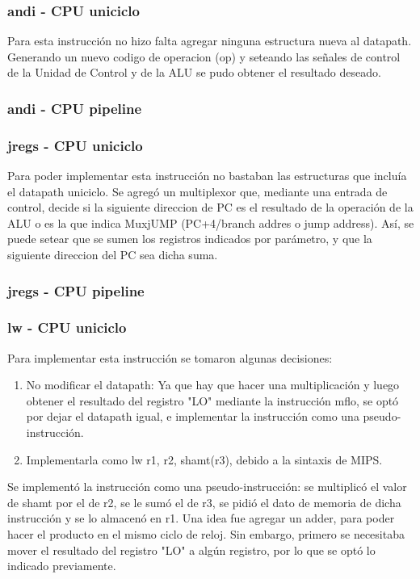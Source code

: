 \documentclass[a4paper, 12pt]{article}
\begin{document}
	\subsubsection{andi - CPU uniciclo}
	Para esta instrucción no hizo falta agregar ninguna estructura nueva al datapath. Generando un nuevo codigo de operacion (op) y seteando las señales de control de la Unidad de Control y de la ALU  se pudo obtener el resultado deseado.
	
	\subsubsection{andi - CPU pipeline}
	
	\subsubsection{jregs - CPU uniciclo}
	Para poder implementar esta instrucción no bastaban las estructuras que incluía el datapath uniciclo.
	Se agregó un multiplexor que, mediante una entrada de control, decide si la siguiente direccion de PC es el resultado de la operación de la ALU o es la que indica MuxjUMP (PC+4/branch addres o jump address). Así, se puede setear que se sumen los registros indicados por parámetro, y que la siguiente direccion del PC sea dicha suma.
	\subsubsection{jregs - CPU pipeline}
	
	\subsubsection{lw - CPU uniciclo}
	Para implementar esta instrucción se tomaron algunas decisiones:
	\begin{enumerate}
	\item No modificar el datapath: Ya que hay que hacer una multiplicación y luego obtener el resultado del registro "LO" mediante la instrucción mflo, se optó por dejar el datapath igual, e implementar la instrucción como una pseudo-instrucción.
	\item Implementarla como lw r1, r2, shamt(r3), debido a la sintaxis de MIPS.
	\end{enumerate}
	Se implementó la instrucción como una pseudo-instrucción: se multiplicó el valor de shamt por el de r2, se le sumó el de r3, se pidió el dato de memoria de dicha instrucción y se lo almacenó en r1.
	Una idea fue agregar un adder, para poder hacer el producto en el mismo ciclo de reloj. Sin embargo, primero se necesitaba mover el resultado del registro "LO" a algún registro, por lo que se optó lo indicado previamente.
	
\end{document}
